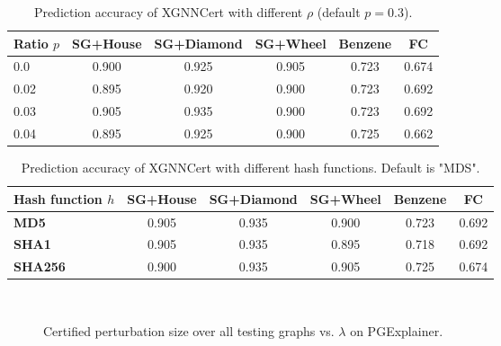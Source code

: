 \begin{table}[!t]
\centering
\begin{tabular}{lccccc}
\toprule
\textbf{Ratio $p$}   & \textbf{SG+House} & \textbf{SG+Diamond} & \textbf{SG+Wheel} & \textbf{Benzene} & \textbf{FC} \\ \midrule
0.0              & 0.900             & 0.925               & 0.905             & 0.723           & 0.674       \\
0.02             & 0.895             & 0.920               & 0.900             & 0.723           & 0.692       \\
0.03             & 0.905             & 0.935               & 0.900             & 0.723           & 0.692       \\
0.04             & 0.895             & 0.925               & 0.900             & 0.725           & 0.662       \\ \bottomrule
\end{tabular}
\caption{Prediction accuracy of XGNNCert 
 with different $\rho$ (default $p=0.3$).}
\label{tab:frac_performance}
\end{table}


\begin{table}[!t]
\centering
\begin{tabular}{lccccc}
\toprule
\textbf{Hash function $h$}   & \textbf{SG+House} & \textbf{SG+Diamond} & \textbf{SG+Wheel} & \textbf{Benzene} & \textbf{FC} \\ \midrule
\textbf{MD5}    & 0.905             & 0.935               & 0.900             & 0.723           & 0.692       \\

\textbf{SHA1}     & 0.905             & 0.935               & 0.895             & 0.718           & 0.692       \\
\textbf{SHA256}  & 0.900             & 0.935               & 0.905             & 0.725           & 0.674       \\ \bottomrule
\end{tabular}
\caption{Prediction accuracy of XGNNCert 
 with different hash functions. Default is "MDS".}
 \vspace{-5mm}
\label{tab:hash_performance}
\end{table}


\begin{figure*}[!t]
	\centering
 \,
	\caption{Certified perturbation size over all testing graphs  vs. $\lambda$ on PGExplainer.} 
	\label{fig:CEA_T_pge_2}
	 \vspace{-2mm}
\end{figure*}



